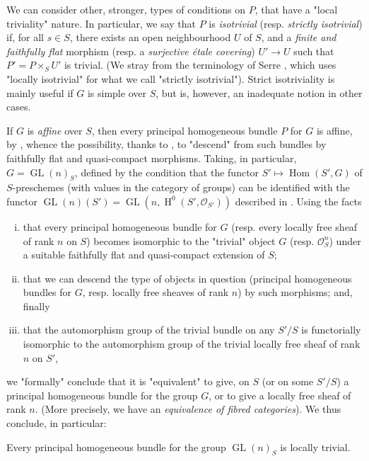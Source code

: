 We can consider other, stronger, types of conditions on $P$, that have a "local triviality" nature.
In particular, we say that $P$ is \emph{isotrivial} (resp. \emph{strictly isotrivial}) if, for all $s\in S$, there exists an open neighbourhood $U$ of $S$, and a \emph{finite and faithfully flat} morphism (resp. a \emph{surjective étale covering}) $U'\to U$ such that $P'=P\times_S U'$ is trivial.
(We stray from the terminology of Serre \cite{GD1960}, which uses "locally isotrivial" for what we call "strictly isotrivial").
Strict isotriviality is mainly useful if $G$ is simple over $S$, but is, however, an inadequate notion in other cases.


If $G$ is \emph{affine} over $S$, then every principal homogeneous bundle $P$ for $G$ is affine, by , whence the possibility, thanks to , to "descend" from such bundles by faithfully flat and quasi-compact morphisms.
Taking, in particular, $G=\operatorname{GL}(n)_S$, defined by the condition that the functor $S'\mapsto\operatorname{Hom}(S',G)$ of $S$-preschemes (with values in the category of groups) can be identified with the functor $\operatorname{GL}(n)(S')=\operatorname{GL}(n,\operatorname{H}^0(S',\mathcal{O}_{S'}))$ described in .
Using the facts

\begin{enumerate}[i.]
    \item that every principal homogeneous bundle for $G$ (resp. every locally free sheaf of rank $n$ on $S$) becomes isomorphic to the "trivial" object $G$ (resp. $\mathcal{O}_S^n$) under a suitable faithfully flat and quasi-compact extension of $S$;
    \item that we can descend the type of objects in question (principal homogeneous bundles for $G$, resp. locally free sheaves of rank $n$) by such morphisms; and, finally
    \item that the automorphism group of the trivial bundle on any $S'/S$ is functorially isomorphic to the automorphism group of the trivial locally free sheaf of rank $n$ on $S'$,
\end{enumerate}

we "formally" conclude that it is "equivalent" to give, on $S$ (or on some $S'/S$) a principal homogeneous bundle for the group $G$, or to give a locally free sheaf of rank $n$.
(More precisely, we have an \emph{equivalence of fibred categories}).
We thus conclude, in particular:


\begin{proposition}\label{fga3.i-b.6-proposition-6.1}
    Every principal homogeneous bundle for the group $\operatorname{GL}(n)_S$ is locally trivial.
\end{proposition}


